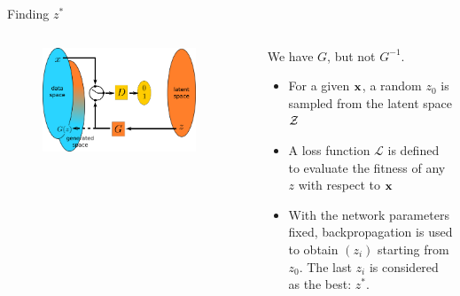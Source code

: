 \documentclass[xcolor=pdftex,dvipsnames,table,mathserif,aspectratio=169]{beamer}
\begin{document}
\begin{frame}{Finding $z^*$}

  \begin{columns}
    \begin{column}{.5\textwidth}
  \begin{figure}[ht]
    \centering
    \includegraphics[width=0.9\textwidth]{gan2}
  \end{figure}

    \end{column}

    \begin{column}{.5\textwidth}
  We have $G$, but not $G^{-1}$.

  \begin{itemize}
  \item For a given $\mathbf{x}$, a random $z_0$ is sampled from the latent space $\cal{Z}$
  \item A loss function $\mathcal{L}$ is defined to evaluate the fitness of any $z$ with respect to $\mathbf{x}$
  \item With the network parameters fixed, backpropagation is used to obtain $(z_i)$ starting from $z_0$. The last $z_i$ is considered as the best: $z^*$.
  \end{itemize}

    \end{column}
  \end{columns}


\end{frame}
\end{document}

